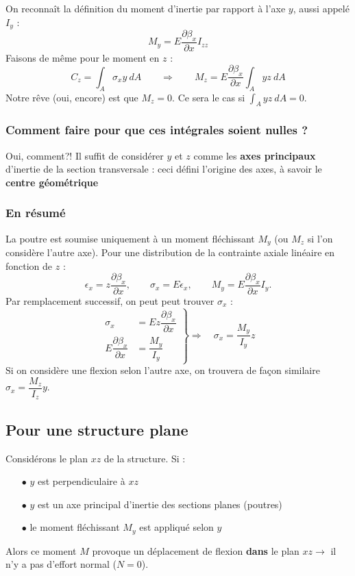 	On reconnaît la définition du moment d’inertie par rapport à l'axe 
	$y$, aussi appelé $I_y$ :
	\begin{equation}
	M_y = E\dfrac{\partial\beta_x}{\partial x}I_{zz}
	\end{equation}
	Faisons de même pour le moment en $z$ :
	\begin{equation}
	C_z = \int_A \sigma_xy\ dA\qquad\Longrightarrow\qquad M_z = E\dfrac{
	\partial \beta_x}{\partial x}\int_Ayz\ dA
	\end{equation}	
	Notre rêve (oui, encore) est que $M_z=0$. Ce sera le cas si $\int_A 
	yz\ dA = 0$.\\
	
		\subsubsection{Comment faire pour que ces intégrales soient nulles ?}
		Oui, comment?! Il suffit de considérer $y$ et $z$ comme les 
		\textbf{axes principaux} d’inertie de la section transversale : ceci 
		défini l’origine des axes, à savoir le \textbf{centre géométrique}
		
		\subsubsection{En résumé}
		La poutre est soumise uniquement à un moment fléchissant $M_y$ (ou 
		$M_z$ si l'on considère l'autre axe).
		Pour une distribution de la contrainte axiale linéaire en fonction 
		de $z$ :
		\begin{equation}
		\epsilon_x = z\dfrac{\partial \beta_x}{\partial x},\qquad \sigma_x 
		= E\epsilon_x,\qquad M_y = E\dfrac{\partial \beta_x}{\partial x}I_y.
		\end{equation}
		Par remplacement successif, on peut peut trouver $\sigma_x$ :
		\begin{equation}
		\left.\begin{array}{ll}
		\sigma_x &= Ez\dfrac{\partial \beta_x}{\partial x}\\
		E\dfrac{\partial\beta_x}{\partial x} &= \dfrac{M_y}{I_y}
		\end{array}\right\}\Longrightarrow\quad \sigma_x = \dfrac{M_y}{I_y}z
		\end{equation}
		Si on considère une flexion selon l'autre axe, on trouvera de 
		façon similaire $\sigma_x = \dfrac{M_z}{I_z}y$.
		
	\subsection{Pour une structure plane}
	Considérons le plan $xz$ de la structure. Si :
	\begin{itemize}
	\item[$\bullet$] $y$ est perpendiculaire à $xz$
	\item[$\bullet$] $y$ est un axe principal d'inertie des sections planes 
	(poutres)
	\item[$\bullet$] le moment fléchissant $M_y$ est appliqué selon $y$
	\end{itemize}		
	Alors ce moment $M$ provoque un déplacement de flexion \textbf{dans} le 
	plan $xz \longrightarrow$ il n'y a pas d'effort normal ($N=0$).
	
